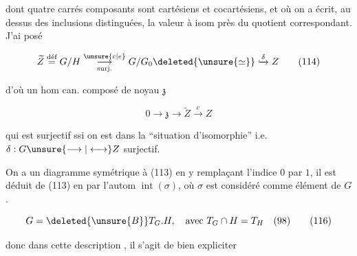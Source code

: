 dont  quatre carrés composants sont cartésiens et cocartésiens, et où on a écrit, au dessus des inclusions distinguées, la valeur à isom près du quotient correspondant. J'ai posé

\[\widetilde Z\overset{\text{déf}}{=}G/H\underset{\mathrm{surj}.}{\overset{\unsure{c|e}}{\longrightarrow}}G/G_0\deleted{\unsure{\simeq}}\lhook\joinrel\xrightarrow{\delta} Z\tag*{(114)}\]


d'où un hom can. composé  de noyau $\mathfrak{z}$

\[0\longrightarrow\mathfrak{z}\longrightarrow\widetilde Z\xrightarrow{c}Z\tag*{(115)}\]



qui  est surjectif ssi on est dans la ``situation d'isomorphie'' i.e. $\delta:G\unsure{\longrightarrow|\longleftrightarrow} Z$ surjectif.


On a un diagramme symétrique à (113) en y remplaçant l'indice $0$ par $1$, il est déduit de (113) en   par l'autom $\operatorname{int}(\sigma)$, où $\sigma$ est considéré comme élément de $G$.


\[G=\deleted{\unsure{B}}T_G.H,\quad\text{avec }T_G\cap H=T_H\quad(98)\tag*{(116)}\]

donc dans cette description , il s'agit de bien expliciter

